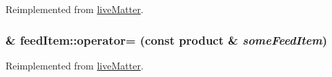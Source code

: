 Reimplemented from \hyperlink{classlive_matter_a6b8311a516ba78a7caacc80a28ec143e}{liveMatter}.\hypertarget{classfeed_item_aff5b258f8da3b96282898cb9fa685c2f}{
\subsubsection[{operator=}]{ \& feedItem::operator= (const {\bf product} \& {\em someFeedItem})}}
\label{classfeed_item_aff5b258f8da3b96282898cb9fa685c2f}


Reimplemented from \hyperlink{classlive_matter_a3b1eb79d0f248a4459874db44c335cac}{liveMatter}.

